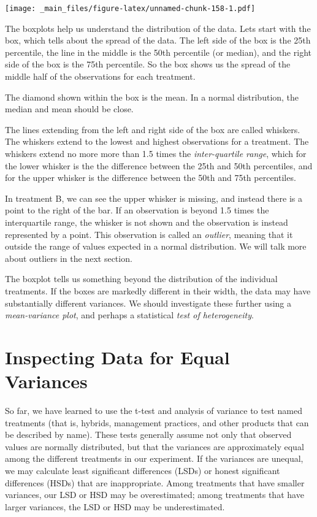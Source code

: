 \documentclass[
]{book}
\begin{document}
\texttt{[image: \_main\_files/figure-latex/unnamed-chunk-158-1.pdf]}

The boxplots help us understand the distribution of the data. Lets start with the box, which tells about the spread of the data. The left side of the box is the 25th percentile, the line in the middle is the 50th percentile (or median), and the right side of the box is the 75th percentile. So the box shows us the spread of the middle half of the observations for each treatment.

The diamond shown within the box is the mean. In a normal distribution, the median and mean should be close.

The lines extending from the left and right side of the box are called whiskers. The whiskers extend to the lowest and highest observations for a treatment. The whiskers extend no more more than 1.5 times the \emph{inter-quartile range}, which for the lower whisker is the the difference between the 25th and 50th percentiles, and for the upper whisker is the difference between the 50th and 75th percentiles.

In treatment B, we can see the upper whisker is missing, and instead there is a point to the right of the bar. If an observation is beyond 1.5 times the interquartile range, the whisker is not shown and the observation is instead represented by a point. This observation is called an \emph{outlier}, meaning that it outside the range of values expected in a normal distribution. We will talk more about outliers in the next section.

The boxplot tells us something beyond the distribution of the individual treatments. If the boxes are markedly different in their width, the data may have substantially different variances. We should investigate these further using a \emph{mean-variance plot}, and perhaps a statistical \emph{test of heterogeneity}.

\hypertarget{inspecting-data-for-equal-variances}{%
\section{Inspecting Data for Equal Variances}\label{inspecting-data-for-equal-variances}}

So far, we have learned to use the t-test and analysis of variance to test named treatments (that is, hybrids, management practices, and other products that can be described by name). These tests generally assume not only that observed values are normally distributed, but that the variances are approximately equal among the different treatments in our experiment. If the variances are unequal, we may calculate least significant differences (LSDs) or honest significant differences (HSDs) that are inappropriate. Among treatments that have smaller variances, our LSD or HSD may be overestimated; among treatments that have larger variances, the LSD or HSD may be underestimated.
\end{document}
